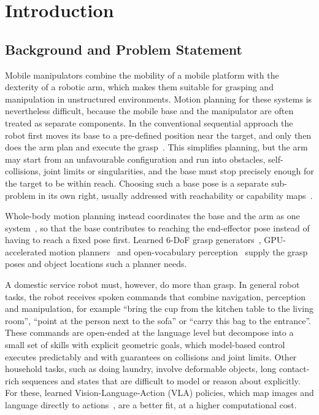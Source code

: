 \documentclass[12pt,a4paper]{article}
\begin{document}
\clearpage
\tableofcontents
\clearpage
{}
\setcounter{page}{1}

\section{Introduction}

\subsection{Background and Problem Statement}

Mobile manipulators combine the mobility of a mobile platform with the dexterity of a robotic
arm, which makes them suitable for grasping and manipulation in unstructured environments.
Motion planning for these systems is nevertheless difficult, because the mobile base and the
manipulator are often treated as separate components. In the conventional sequential approach
the robot first moves its base to a pre-defined position near the target, and only then does
the arm plan and execute the grasp~\cite{suarezruiz2022}. This simplifies planning, but the arm
may start from an unfavourable configuration and run into obstacles, self-collisions, joint
limits or singularities, and the base must stop precisely enough for the target to be within
reach. Choosing such a base pose is a separate sub-problem in its own right, usually addressed
with reachability or capability maps~\cite{suarezruiz2022,vahrenkamp2010}.

Whole-body motion planning instead coordinates the base and the arm as one
system~\cite{suarezruiz2022,kim2022nmpc}, so that the base contributes to reaching the
end-effector pose instead of having to reach a fixed pose first. Learned 6-DoF grasp
generators~\cite{sundermeyer2021contact,murali2026graspgen}, GPU-accelerated motion
planners~\cite{sundaralingam2023curobo} and open-vocabulary perception~\cite{wang2025yoloe} supply
the grasp poses and object locations such a planner needs.

A domestic service robot must, however, do more than grasp. In general robot tasks, the robot receives
spoken commands that combine navigation, perception and manipulation, for example ``bring the cup from the kitchen table to the living room'', ``point at
the person next to the sofa'' or ``carry this bag to the entrance''. These commands are open-ended at
the language level but decompose into a small set of skills with explicit geometric goals, which
model-based control executes predictably and with guarantees on collisions and joint limits. Other
household tasks, such as doing laundry, involve deformable objects, long contact-rich sequences and
states that are difficult to model or reason about explicitly. For these, learned
Vision-Language-Action (VLA) policies, which map images and language directly to
actions~\cite{kawaharazuka2025vla,uddin2025vla}, are a better fit, at a higher computational cost.
\end{document}
